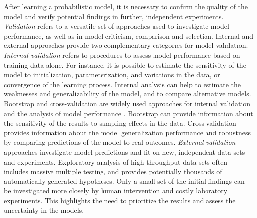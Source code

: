 After learning a probabilistic model, it is necessary to confirm the
quality of the model and verify potential findings in further,
independent experiments. {\it Validation} refers to a versatile set of
approaches used to investigate model performance, as well as in model
criticism, comparison and selection.  Internal and external approaches
provide two complementary categories for model validation. {\it
  Internal validation} refers to procedures to assess model
performance based on training data alone. For instance, it is possible
to estimate the sensitivity of the model to initialization,
parameterization, and variations in the data, or convergence of the
learning process. Internal analysis can help to estimate the
weaknesses and generalizability of the model, and to compare
alternative models. Bootstrap and cross-validation are widely used
approaches for internal validation and the analysis of model
performance \citep[see e.g.][]{Bishop06}. Bootstrap can provide
information about the sensitivity of the results to sampling effects
in the data. Cross-validation provides information about the model
generalization performance and robustness by comparing predictions of
the model to real outcomes. {\it External validation} approaches
investigate model predictions and fit on new, independent data sets
and experiments. Exploratory analysis of high-throughput data sets
often includes massive multiple testing, and provides potentially
thousands of automatically generated hypotheses. Only a small set of
the initial findings can be investigated more closely by human
intervention and costly laboratory experiments. This highlights the
need to prioritize the results and assess the uncertainty in the
models.
